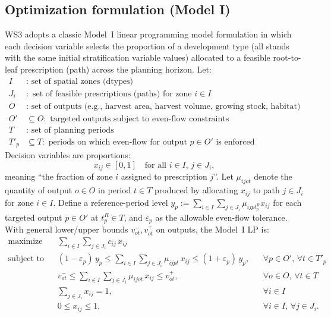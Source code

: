 \documentclass[review]{elsarticle}
\begin{document}
\subsection{Optimization formulation (Model I)}
WS3 adopts a classic Model~I linear programming model formulation \citep{johnson1977techniques, gunn2007models} in which each decision variable selects the proportion of a development type (all stands with the same initial stratification variable values) allocated to a feasible root-to-leaf prescription (path) across the planning horizon. Let:
\begin{align*}
  I &: \text{ set of spatial zones (dtypes)} \\
  J_i &: \text{ set of feasible prescriptions (paths) for zone } i\in I \\
  O &: \text{ set of outputs (e.g., harvest area, harvest volume, growing stock, habitat)} \\
  O'&\subseteq O: \text{ targeted outputs subject to even-flow constraints} \\
  T &: \text{ set of planning periods} \\
  T'_p&\subseteq T: \text{ periods on which even-flow for output } p\in O' \text{ is enforced}
\end{align*}
Decision variables are proportions:
\[
x_{ij}\in[0,1] \quad \text{for all } i\in I,\, j\in J_i,
\]
meaning ``the fraction of zone $i$ assigned to prescription $j$''. Let $\mu_{ijot}$ denote the quantity of output $o\in O$ in period $t\in T$ produced by allocating $x_{ij}$ to path $j\in J_i$ for zone $i\in I$. Define a reference-period level $y_p:=\sum_{i\in I}\sum_{j\in J_i}\mu_{ijpt_p^R}x_{ij}$ for each targeted output $p\in O'$ at $t_p^R\in T$, and $\varepsilon_p$ as the allowable even-flow tolerance. With general lower/upper bounds $v^-_{ot},v^+_{ot}$ on outputs, the Model~I LP is:
\begin{align}
\text{maximize}\quad
& \sum_{i\in I}\sum_{j\in J_i} c_{ij}\,x_{ij} \label{eq:ws3_obj}\\
\text{subject to}\quad
& (1-\varepsilon_p)\,y_p \le \sum_{i\in I}\sum_{j\in J_i}\mu_{ijpt}\,x_{ij} \le (1+\varepsilon_p)\,y_p, && \forall p\in O',\, \forall t\in T'_p \label{eq:ws3_evenflow}\\
& v^-_{ot} \le \sum_{i\in I}\sum_{j\in J_i}\mu_{ijot}\,x_{ij} \le v^+_{ot}, && \forall o\in O,\, \forall t\in T \label{eq:ws3_bounds}\\
& \sum_{j\in J_i} x_{ij} = 1, && \forall i\in I \label{eq:ws3_coverage}\\
& 0 \le x_{ij} \le 1, && \forall i\in I,\, \forall j\in J_i. \label{eq:ws3_box}
\end{align}
\end{document}
